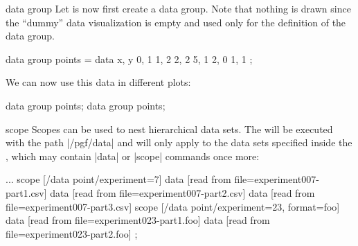 \begin{datavisualizationoperation}{data group}{}
  Let is now first create a data group. Note that nothing is drawn since
  the ``dummy'' data visualization is empty and used only for the
  definition of the data group.
\begin{codeexample}[]
\tikz \datavisualization data group {points} = {
  data {
    x, y
    0, 1
    1, 2
    2, 2
    5, 1
    2, 0
    1, 1
  }
};
\end{codeexample}

  We can now use this data in different plots:
\begin{codeexample}[]
\tikz {} data group {points};
\qquad
\tikz {} data group {points};
\end{codeexample}
\end{datavisualizationoperation}


\begin{datavisualizationoperation}{scope}{}
  Scopes can be used to nest hierarchical data sets. The
   will be executed with the path |/pgf/data| and will
  only apply to the data sets specified inside the , which may contain |data| or |scope| commands once more:
\begin{codeexample}
\datavisualization...
  scope [/data point/experiment=7]
  {
    data [read from file=experiment007-part1.csv]
    data [read from file=experiment007-part2.csv]
    data [read from file=experiment007-part3.csv]
  }
  scope [/data point/experiment=23, format=foo]
  {
    data [read from file=experiment023-part1.foo]
    data [read from file=experiment023-part2.foo]
  };
\end{codeexample}
\end{datavisualizationoperation}


